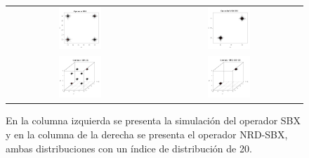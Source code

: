 \begin{figure}
\centering
\begin{tabular}{cc}
   \includegraphics[width=0.3\textwidth]{img/Operadores/SBX_2D_Index_20.png} &
   \includegraphics[width=0.3\textwidth]{img/Operadores/DSBX_2D_Index_20.png} \\   
   \includegraphics[width=0.3\textwidth]{img/Operadores/SBX_3D_Index_20.png} &
   \includegraphics[width=0.3\textwidth]{img/Operadores/DSBX_3D_Index_20.png}  
\end{tabular}
\caption{En la columna izquierda se presenta la simulación del operador  SBX y en la columna de la derecha se presenta el operador NRD-SBX, ambas distribuciones con un índice de distribución de 20.}
\label{fig:Simulations_Index_20}
\end{figure}


